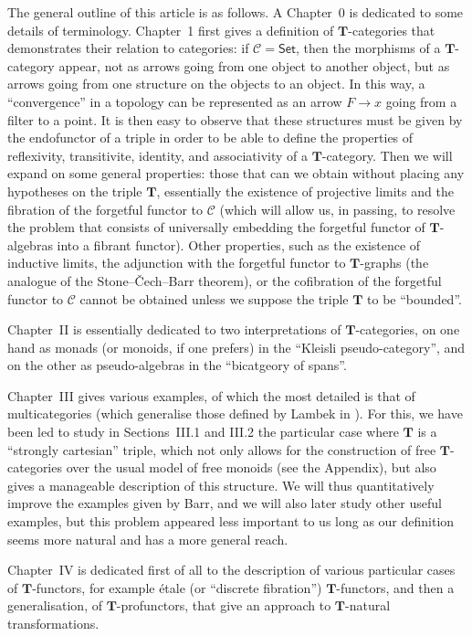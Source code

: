 \documentclass{article}
\newcommand{\oldpage}[1]{\marginpar{\footnotesize$\Big\vert$ \textit{p.~#1}}}
\newcommand{\cat}[1]{\mathcal{#1}}
\newcommand{\Cat}[1]{\mathsf{#1}}
\newcommand{\TT}{\mathbf{T}}
\begin{document}
\oldpage{216}
The general outline of this article is as follows.
A Chapter~0 is dedicated to some details of terminology.
Chapter~1 first gives a definition of $\TT$-categories that demonstrates their relation to categories: if $\cat{C}=\Cat{Set}$, then the morphisms of a $\TT$-category appear, not as arrows going from one object to another object, but as arrows going from one structure on the objects to an object.
In this way, a ``convergence'' in a topology can be represented as an arrow $F\to x$ going from a filter to a point.
It is then easy to observe that these structures must be given by the endofunctor of a triple in order to be able to define the properties of reflexivity, transitivite, identity, and associativity of a $\TT$-category.
Then we will expand on some general properties: those that can we obtain without placing any hypotheses on the triple $\TT$, essentially the existence of projective limits and the fibration of the forgetful functor to $\cat{C}$ (which will allow us, in passing, to resolve the problem that consists of universally embedding the forgetful functor of $\TT$-algebras into a fibrant functor).
Other properties, such as the existence of inductive limits, the adjunction with the forgetful functor to $\TT$-graphs (the analogue of the Stone--Čech--Barr theorem), or the cofibration of the forgetful functor to $\cat{C}$ cannot be obtained unless we suppose the triple $\TT$ to be ``bounded''.

Chapter~II is essentially dedicated to two interpretations of $\TT$-categories, on one hand as monads (or monoids, if one prefers) in the ``Kleisli pseudo-category'', and on the other as pseudo-algebras in the ``bicatgeory of spans''.

Chapter~III gives various examples, of which the most detailed is that of multicategories (which generalise those defined by Lambek in \cite{La}).
For this, we have been led to study in Sections~III.1 and III.2 the particular case where $\TT$ is a ``strongly cartesian'' triple, which not only allows for the construction of free $\TT$-categories over the usual model of free monoids (see the Appendix), but also gives a manageable description of this structure.
\oldpage{217}
We will thus quantitatively improve the examples given by Barr, and we will also later study other useful examples, but this problem appeared less important to us long as our definition seems more natural and has a more general reach.

Chapter~IV is dedicated first of all to the description of various particular cases of $\TT$-functors, for example étale (or ``discrete fibration'') $\TT$-functors, and then a generalisation, of $\TT$-profunctors, that give an approach to $\TT$-natural transformations.
\end{document}
